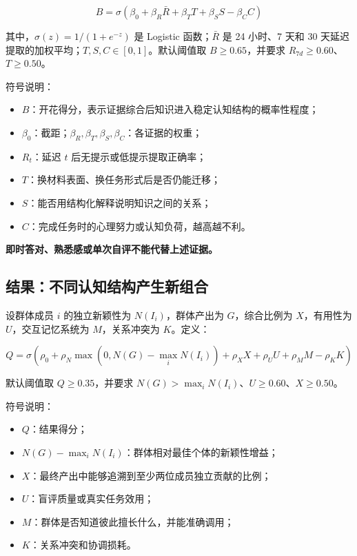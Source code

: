 \documentclass[UTF8,a4paper,11pt]{ctexart}
\newcommand{\warn}[1]{\textcolor{red!70!black}{\textbf{#1}}}
\begin{document}
\begin{equation}
B=\sigma\left(\beta_0+\beta_R \bar R+\beta_T T+\beta_S S-\beta_C C\right)
\end{equation}

其中，$\sigma(z)=1/(1+e^{-z})$ 是 Logistic 函数；$\bar R$ 是 24 小时、7 天和 30 天延迟提取的加权平均；$T,S,C\in[0,1]$。默认阈值取 $B\ge0.65$，并要求 $R_{7d}\ge0.60$、$T\ge0.50$。

符号说明：
\begin{itemize}[leftmargin=2em]
\item $B$：开花得分，表示证据综合后知识进入稳定认知结构的概率性程度；
\item $\beta_0$：截距；$\beta_R,\beta_T,\beta_S,\beta_C$：各证据的权重；
\item $R_t$：延迟 $t$ 后无提示或低提示提取正确率；
\item $T$：换材料表面、换任务形式后是否仍能迁移；
\item $S$：能否用结构化解释说明知识之间的关系；
\item $C$：完成任务时的心理努力或认知负荷，越高越不利。
\end{itemize}

\warn{即时答对、熟悉感或单次自评不能代替上述证据。}

\subsection{结果：不同认知结构产生新组合}

设群体成员 $i$ 的独立新颖性为 $N(I_i)$，群体产出为 $G$，综合比例为 $X$，有用性为 $U$，交互记忆系统为 $M$，关系冲突为 $K$。定义：

\begin{equation}
Q=\sigma\left(\rho_0+\rho_N\max(0,N(G)-\max_i N(I_i))+\rho_X X+\rho_U U+\rho_M M-\rho_K K\right)
\end{equation}

默认阈值取 $Q\ge0.35$，并要求 $N(G)>\max_i N(I_i)$、$U\ge0.60$、$X\ge0.50$。

符号说明：
\begin{itemize}[leftmargin=2em]
\item $Q$：结果得分；
\item $N(G)-\max_i N(I_i)$：群体相对最佳个体的新颖性增益；
\item $X$：最终产出中能够追溯到至少两位成员独立贡献的比例；
\item $U$：盲评质量或真实任务效用；
\item $M$：群体是否知道彼此擅长什么，并能准确调用；
\item $K$：关系冲突和协调损耗。
\end{itemize}
\end{document}
